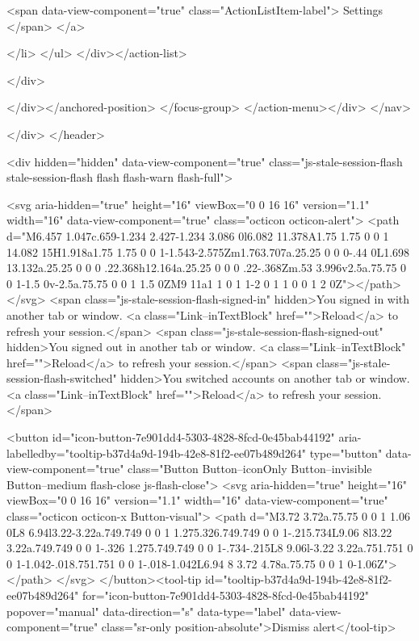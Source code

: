 {{        <span data-view-component="true" class="ActionListItem-label">
          Settings
</span>      
</a>
  
</li>
</ul>    
</div></action-list>


</div>
      
</div></anchored-position>  </focus-group>
</action-menu></div>
</nav>
          
        </div>
</header>


      <div hidden="hidden" data-view-component="true" class="js-stale-session-flash stale-session-flash flash flash-warn flash-full">
  
        <svg aria-hidden="true" height="16" viewBox="0 0 16 16" version="1.1" width="16" data-view-component="true" class="octicon octicon-alert">
    <path d="M6.457 1.047c.659-1.234 2.427-1.234 3.086 0l6.082 11.378A1.75 1.75 0 0 1 14.082 15H1.918a1.75 1.75 0 0 1-1.543-2.575Zm1.763.707a.25.25 0 0 0-.44 0L1.698 13.132a.25.25 0 0 0 .22.368h12.164a.25.25 0 0 0 .22-.368Zm.53 3.996v2.5a.75.75 0 0 1-1.5 0v-2.5a.75.75 0 0 1 1.5 0ZM9 11a1 1 0 1 1-2 0 1 1 0 0 1 2 0Z"></path>
</svg>
        <span class="js-stale-session-flash-signed-in" hidden>You signed in with another tab or window. <a class="Link--inTextBlock" href="">Reload</a> to refresh your session.</span>
        <span class="js-stale-session-flash-signed-out" hidden>You signed out in another tab or window. <a class="Link--inTextBlock" href="">Reload</a> to refresh your session.</span>
        <span class="js-stale-session-flash-switched" hidden>You switched accounts on another tab or window. <a class="Link--inTextBlock" href="">Reload</a> to refresh your session.</span>

    <button id="icon-button-7e901dd4-5303-4828-8fcd-0e45bab44192" aria-labelledby="tooltip-b37d4a9d-194b-42e8-81f2-ee07b489d264" type="button" data-view-component="true" class="Button Button--iconOnly Button--invisible Button--medium flash-close js-flash-close">  <svg aria-hidden="true" height="16" viewBox="0 0 16 16" version="1.1" width="16" data-view-component="true" class="octicon octicon-x Button-visual">
    <path d="M3.72 3.72a.75.75 0 0 1 1.06 0L8 6.94l3.22-3.22a.749.749 0 0 1 1.275.326.749.749 0 0 1-.215.734L9.06 8l3.22 3.22a.749.749 0 0 1-.326 1.275.749.749 0 0 1-.734-.215L8 9.06l-3.22 3.22a.751.751 0 0 1-1.042-.018.751.751 0 0 1-.018-1.042L6.94 8 3.72 4.78a.75.75 0 0 1 0-1.06Z"></path>
</svg>
</button><tool-tip id="tooltip-b37d4a9d-194b-42e8-81f2-ee07b489d264" for="icon-button-7e901dd4-5303-4828-8fcd-0e45bab44192" popover="manual" data-direction="s" data-type="label" data-view-component="true" class="sr-only position-absolute">Dismiss alert</tool-tip>


}}
